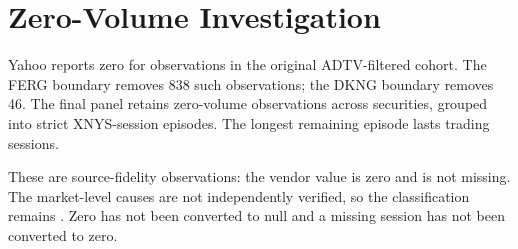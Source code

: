 \section{Zero-Volume Investigation}

Yahoo reports zero for \OriginalZeroVolumeRows{} observations in the original
ADTV-filtered cohort. The FERG boundary removes 838 such observations; the
DKNG boundary removes 46. The final panel retains \FinalZeroVolumeRows{}
zero-volume observations across \FinalZeroVolumeSecurities{} securities,
grouped into \FinalZeroVolumeEpisodes{} strict XNYS-session episodes. The
longest remaining episode lasts \FinalZeroVolumeLongest{} trading sessions.

These are source-fidelity observations: the vendor value is zero and is not
missing. The market-level causes are not independently verified, so the
classification remains . Zero has
not been converted to null and a missing session has not been converted to
zero.


\begin{table}[H]
\centering
\caption{Remaining zero-volume observations by security}
\label{tab:remaining-zero}
\scriptsize
{}
\end{table}
